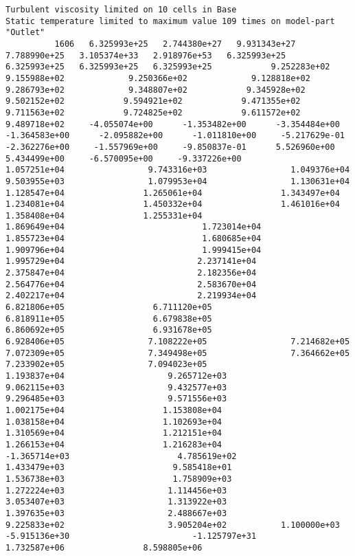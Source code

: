 \documentclass{article}
\begin{document}
{\tiny 
\begin{verbatim}
Turbulent viscosity limited on 10 cells in Base
Static temperature limited to maximum value 109 times on model-part "Outlet"
          1606   6.325993e+25   2.744380e+27   9.931343e+27   7.788990e+25   3.105374e+33   2.918976e+53   6.325993e+25   6.325993e+25   6.325993e+25   6.325993e+25            9.252283e+02             9.155988e+02             9.250366e+02             9.128818e+02             9.286793e+02             9.348807e+02            9.345928e+02            9.502152e+02            9.594921e+02            9.471355e+02            9.711563e+02            9.724825e+02            9.611572e+02            9.489718e+02     -4.055074e+00      -1.353482e+00      -3.354484e+00      -1.364583e+00      -2.095882e+00      -1.011810e+00     -5.217629e-01     -2.362276e+00     -1.557969e+00     -9.850837e-01      5.526960e+00      5.434499e+00     -6.570095e+00     -9.337226e+00                1.057251e+04                 9.743316e+03                 1.049376e+04                 9.503955e+03                 1.079953e+04                 1.130631e+04                1.128547e+04                1.265061e+04                1.343497e+04                1.234081e+04                1.450332e+04                1.461016e+04                1.358408e+04                1.255331e+04                           1.869649e+04                            1.723014e+04                            1.855723e+04                            1.680685e+04                            1.909796e+04                            1.999415e+04                           1.995729e+04                           2.237141e+04                           2.375847e+04                           2.182356e+04                           2.564776e+04                           2.583670e+04                           2.402217e+04                           2.219934e+04                 6.821806e+05                  6.711120e+05                  6.818911e+05                  6.679838e+05                  6.860692e+05                  6.931678e+05                 6.928406e+05                 7.108222e+05                 7.214682e+05                 7.072309e+05                 7.349498e+05                 7.364662e+05                 7.233902e+05                 7.094023e+05                    1.193837e+04                     9.265712e+03                     9.062115e+03                     9.432577e+03                     9.296485e+03                     9.571556e+03                    1.002175e+04                    1.153808e+04                    1.038158e+04                    1.102693e+04                    1.310569e+04                    1.212151e+04                    1.266153e+04                    1.216283e+04                    -1.365714e+03                      4.785619e+02                      1.433479e+03                      9.585418e+01                      1.536738e+03                      1.758909e+03                     1.272224e+03                     1.114456e+03                     3.053407e+03                     1.313922e+03                     1.397635e+03                     2.488667e+03                     9.225833e+02                     3.905204e+02           1.100000e+03      -5.915136e+30                         -1.125797e+31               1.732587e+06                8.598805e+06 

\end{verbatim}}
\end{document}
